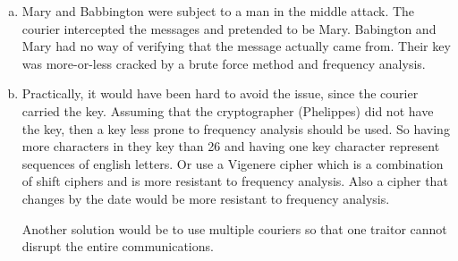 \documentclass[11pt]{article}
\begin{document}
\begin{enumerate}[a)]
\item Mary and Babbington were subject to a man in the middle attack. The courier intercepted the messages and pretended to be Mary. Babington and Mary had no way of verifying that the message actually came from. Their key was more-or-less cracked by a brute force method and frequency analysis. 

\item Practically, it would have been hard to avoid the issue, since the courier carried the key. Assuming that the cryptographer (Phelippes) did not have the key, then a key less prone to frequency analysis should be used. So having more characters in they key than 26 and having one key character represent sequences of english letters. Or use a Vigenere cipher which is a combination of shift ciphers and is more resistant to frequency analysis. Also a cipher that changes by the date would be more resistant to frequency analysis. 

Another solution would be to use multiple couriers so that one traitor cannot disrupt the entire communications. 
\end{enumerate}



 
\end{document}
